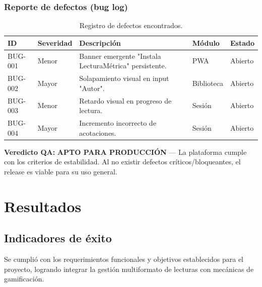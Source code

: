 \documentclass[12pt, atypical, journal]{article}
\begin{document}
\subsubsection{Reporte de defectos (bug log)}
\begin{table}[H]
\centering
\small
\renewcommand{\arraystretch}{1.2}
\begin{tabular}{|l|l|p{4.8cm}|p{3.2cm}|l|}
\hline
\textbf{ID} & \textbf{Severidad} & \textbf{Descripción} & \textbf{Módulo} & \textbf{Estado} \\ \hline
BUG-001 & Menor & Banner emergente "Instala LecturaMétrica" persistente. & PWA & Abierto \\ \hline
BUG-002 & Mayor & Solapamiento visual en input "Autor". & Biblioteca & Abierto \\ \hline
BUG-003 & Menor & Retardo visual en progreso de lectura. & Sesión & Abierto \\ \hline
BUG-004 & Mayor & Incremento incorrecto de acotaciones. & Sesión & Abierto \\ \hline
\end{tabular}
\caption{Registro de defectos encontrados.}
\label{tab:bug_log}
\end{table}

\vspace{0.5em}
\noindent\textbf{Veredicto QA:} \textbf{APTO PARA PRODUCCIÓN} --- La plataforma cumple con los criterios de estabilidad. Al no existir defectos críticos/bloqueantes, el release es viable para su uso general.

\newpage

\section{Resultados}

\subsection{Indicadores de éxito}
Se cumplió con los requerimientos funcionales y objetivos establecidos para el proyecto, logrando integrar la gestión multiformato de lecturas con mecánicas de gamificación.
\end{document}
